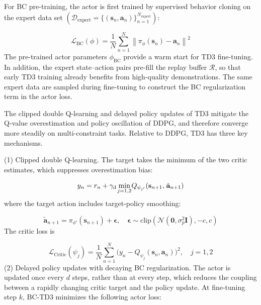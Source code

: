 For BC pre-training, the actor is first trained by supervised behavior cloning on the expert data set $({\mathcal{D}_{{\text{expert}}}} = \{ ({{\mathbf{s}}_n},{{\mathbf{a}}_n})\} _{n = 1}^{{N_{{\text{expert}}}}})$:

\begin{equation}
\label{eq:78}
{\mathcal{L}_{{\text{BC}}}}(\phi ) = \frac{1}{N}\sum\limits_{n = 1}^N {{{\left\| {{\pi _\phi }({{\mathbf{s}}_n}) - {{\mathbf{a}}_n}} \right\|}^2}} 
\end{equation}
The pre-trained actor parameters ${\phi _{{\text{BC}}}}$ provide a warm start for TD3 fine-tuning. In addition, the expert state--action pairs pre-fill the replay buffer $\mathcal{R}$, so that early TD3 training already benefits from high-quality demonstrations. The same expert data are sampled during fine-tuning to construct the BC regularization term in the actor loss.

The clipped double Q-learning and delayed policy updates of TD3 mitigate the Q-value overestimation and policy oscillation of DDPG, and therefore converge more steadily on multi-constraint tasks. Relative to DDPG, TD3 has three key mechanisms.

(1) Clipped double Q-learning. The target takes the minimum of the two critic estimates, which suppresses overestimation bias:

\begin{equation}
\label{eq:79}
{y_n} = {r_n} + \gamma _{\mathrm{d}} {\kern 1pt} {\min _{j = 1,2}}{Q_{{\psi _{j'}}}}({{\mathbf{s}}_{n + 1}},{\kern 1pt} {\tilde{\mathbf{a}}_{n + 1}})
\end{equation}
where the target action includes target-policy smoothing:

\begin{equation}
\label{eq:80}
{\tilde{\mathbf{a}}_{n + 1}} = {\pi _{\phi '}}({{\mathbf{s}}_{n + 1}}) + {\boldsymbol{\epsilon }},\quad {\boldsymbol{\epsilon }} \sim {\text{clip}}\left( {\mathcal{N}({\mathbf{0}},\sigma _p^2{\mathbf{I}}), - c,c} \right)
\end{equation}
The critic loss is

\begin{equation}
\label{eq:81}
{\mathcal{L}_{{\text{Critic}}}}({\psi _j}) = \frac{1}{N}\sum\limits_{n = 1}^N ( {y_n} - {Q_{{\psi _j}}}({{\mathbf{s}}_n},{{\mathbf{a}}_n}){)^2},\quad j = 1,2
\end{equation}
(2) Delayed policy updates with decaying BC regularization. The actor is updated once every $d$ steps, rather than at every step, which reduces the coupling between a rapidly changing critic target and the policy update. At fine-tuning step $k$, BC-TD3 minimizes the following actor loss:

